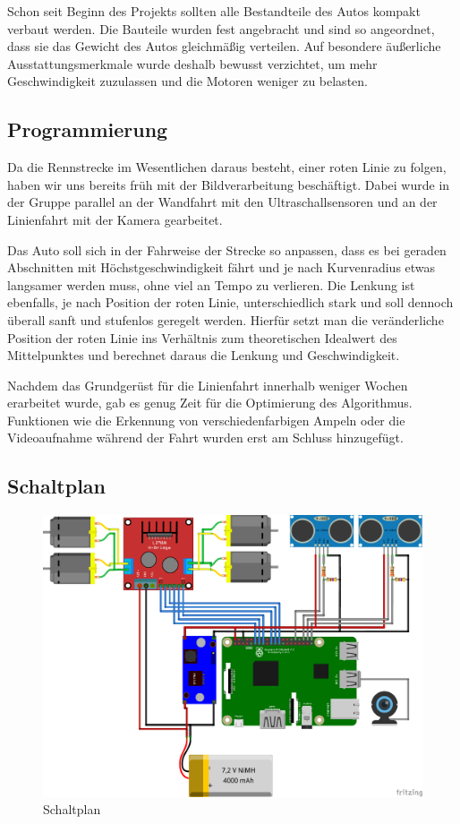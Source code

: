 \documentclass[a4paper, 12pt]{scrartcl}
\begin{document}
Schon seit Beginn des Projekts sollten alle Bestandteile des Autos kompakt verbaut werden. Die Bauteile wurden fest angebracht und sind so angeordnet, dass sie das Gewicht des Autos gleichmäßig verteilen. Auf besondere äußerliche Ausstattungsmerkmale wurde deshalb bewusst verzichtet, um mehr Geschwindigkeit zuzulassen und die Motoren weniger zu belasten.

\subsection{Programmierung}

Da die Rennstrecke im Wesentlichen daraus besteht, einer roten Linie zu folgen, haben wir uns bereits früh mit der Bildverarbeitung beschäftigt. Dabei wurde in der Gruppe parallel an der Wandfahrt mit den Ultraschallsensoren und an der Linienfahrt mit der Kamera gearbeitet.

Das Auto soll sich in der Fahrweise der Strecke so anpassen, dass es bei geraden Abschnitten mit Höchstgeschwindigkeit fährt und je nach Kurvenradius etwas langsamer werden muss, ohne viel an Tempo zu verlieren. Die Lenkung ist ebenfalls, je nach Position der roten Linie, unterschiedlich stark und soll dennoch überall sanft und stufenlos geregelt werden. Hierfür setzt man die veränderliche Position der roten Linie ins Verhältnis zum theoretischen Idealwert des Mittelpunktes und berechnet daraus die Lenkung und Geschwindigkeit.

Nachdem das Grundgerüst für die Linienfahrt innerhalb weniger Wochen erarbeitet wurde, gab es genug Zeit für die Optimierung des Algorithmus. Funktionen wie die Erkennung von verschiedenfarbigen Ampeln oder die Videoaufnahme während der Fahrt wurden erst am Schluss hinzugefügt.

\subsection{Schaltplan}

\begin{figure}[H] 
	\centering
	\includegraphics[width=.75\textwidth]{Schaltplan.pdf}
	\caption{Schaltplan}
	\label{schaltplan}
\end{figure}
\end{document}
